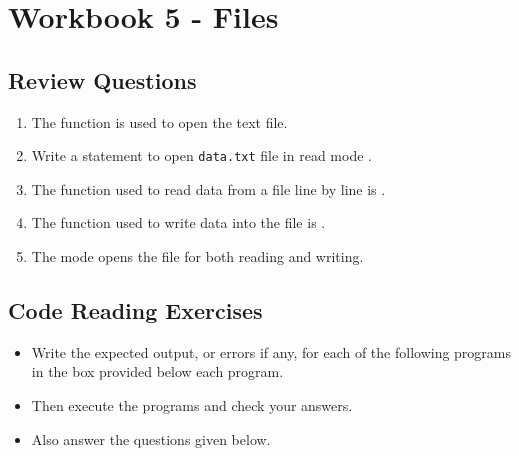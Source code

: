 \documentclass[11pt,a4paper]{article}
\begin{document}
\section*{Workbook 5 - Files}
\subsection*{Review Questions}

\begin{enumerate}\itemsep10pt
    \item The \underline{\hspace{3cm}} function is used to open the text file. 
    \item Write a statement to open \texttt{data.txt} file in read mode \underline{\hspace{3cm}}.      
    \item The function used to read data from a file line by line is \underline{\hspace{4cm}}.
    \item The function used to write data into the file is \underline{\hspace{3cm}}.
    \item The \underline{\hspace{3cm}} mode opens the file for both reading and writing.  
\end{enumerate}

\subsection*{Code Reading Exercises}
\begin{itemize}
    \item Write the expected output, or errors if any, for each of the following programs in the box provided below each program.
    \item Then execute the programs and check your answers.
    \item Also answer the questions given below.
\end{itemize}
\end{document}

